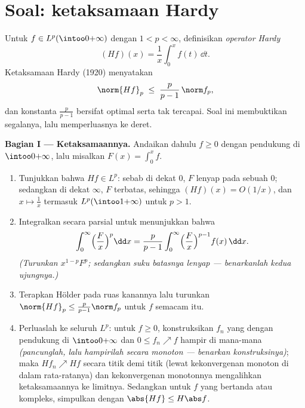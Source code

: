 \section{Soal: ketaksamaan Hardy}

\begin{problem}\label{pb:b3:lp:1}
Untuk $f \in L^p(\intoo0{+\infty})$ dengan $1 < p < \infty$, definisikan
\emph{operator Hardy}
\[
(Hf)(x) = \frac1x\int_0^x f(t)\,\dd t .
\]
Ketaksamaan Hardy (1920) menyatakan
\[
\norm{Hf}_p \;\leq\; \frac{p}{p-1}\,\norm f_p ,
\]
dan konstanta $\frac p{p-1}$ bersifat optimal serta tak tercapai.
Soal ini membuktikan segalanya, lalu memperluasnya ke deret.

\medskip
\noindent\textbf{Bagian I --- Ketaksamaannya.} Andaikan dahulu $f
\geq 0$  dengan pendukung  di
$\intoo0{+\infty}$, lalu misalkan $F(x) = \int_0^xf$.
\begin{enumerate}
  \item Tunjukkan bahwa $Hf \in L^p$: sebab di dekat $0$, $F$ lenyap pada sebuah
         $0$; sedangkan di dekat $\infty$, $F$ terbatas, sehingga
        $(Hf)(x) = O(1/x)$, dan $x \mapsto \frac1x$ termasuk
        $L^p(\intoo1{+\infty})$ untuk $p > 1$.
  \item Integralkan secara parsial untuk menunjukkan bahwa
        \[
        \int_0^\infty \Bigl(\frac Fx\Bigr)^p\dd x
        = \frac{p}{p-1}\int_0^\infty\Bigl(\frac
        Fx\Bigr)^{p-1}f(x)\,\dd x .
        \]
        \emph{(Turunkan $x^{1-p}F^p$; sedangkan suku batasnya
        lenyap --- benarkanlah kedua ujungnya.)}
  \item Terapkan Hölder pada ruas kanannya lalu turunkan
        $\norm{Hf}_p \leq \frac p{p-1}\norm f_p$ untuk $f$ semacam itu.
  \item Perluaslah ke seluruh $L^p$: untuk $f \geq 0$, konstruksikan
        $f_n$ yang  dengan pendukung  di
        $\intoo0{+\infty}$ dan $0 \leq f_n \nearrow f$ hampir di mana-mana
        \emph{(pancunglah, lalu hampirilah secara monoton ---
        benarkan konstruksinya)}; maka $Hf_n \nearrow Hf$
        secara titik demi titik (lewat kekonvergenan monoton di dalam rata-ratanya) dan kekonvergenan monotonnya mengalihkan
        ketaksamaannya ke limitnya. Sedangkan untuk $f$ yang bertanda atau kompleks,
        simpulkan dengan $\abs{Hf} \leq H\abs f$.
\end{enumerate}


\end{problem}
